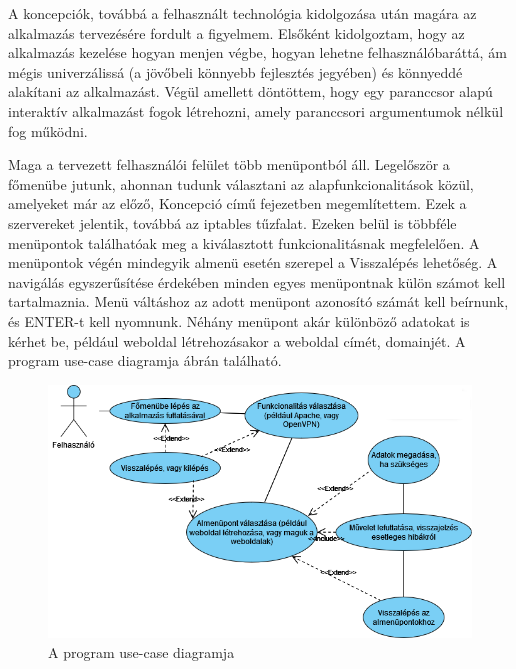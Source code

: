 
A koncepciók, továbbá a felhasznált technológia kidolgozása után magára az alkalmazás tervezésére fordult a figyelmem. Elsőként kidolgoztam, hogy az alkalmazás kezelése hogyan menjen végbe, hogyan lehetne felhasználóbaráttá, ám mégis univerzálissá (a jövőbeli könnyebb fejlesztés jegyében) és könnyeddé alakítani az alkalmazást. Végül amellett döntöttem, hogy egy paranccsor alapú interaktív alkalmazást fogok létrehozni, amely paranccsori argumentumok nélkül fog működni.


Maga a tervezett felhasználói felület több menüpontból áll. Legelőször a főmenübe jutunk, ahonnan tudunk választani az alapfunkcionalitások közül, amelyeket már az előző, Koncepció című fejezetben megemlítettem. Ezek a szervereket jelentik, továbbá az iptables tűzfalat. Ezeken belül is többféle menüpontok találhatóak meg a kiválasztott funkcionalitásnak megfelelően. A menüpontok végén mindegyik almenü esetén szerepel a Visszalépés lehetőség. A navigálás egyszerűsítése érdekében minden egyes menüpontnak külön számot kell tartalmaznia. Menü váltáshoz az adott menüpont azonosító számát kell beírnunk, és ENTER-t kell nyomnunk. Néhány menüpont akár különböző adatokat is kérhet be, például weboldal létrehozásakor a weboldal címét, domainjét.
A program use-case diagramja  ábrán található.

\begin{figure}[!h]
\centering
\includegraphics[scale=0.42]{images/usecase_diagram.png}
\caption{A program use-case diagramja}
\label{fig:usecase_diagram}
\end{figure}

\pagebreak

